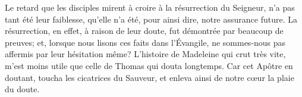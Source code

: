 Le retard que les disciples mirent à croire à la résurrection du Seigneur,
	n’a pas tant été leur faiblesse,
	qu’elle n’a été, pour ainsi dire, notre assurance future.
La résurrection, en effet, à raison de leur doute,
	fut démontrée par beaucoup de preuves;
	et, lorsque nous lisons ces faits dans l’Évangile,
	ne sommes-nous pas affermis par leur hésitation même?
L’histoire de Madeleine qui crut très vite,
	m’est moins utile que celle de Thomas qui douta longtemps.
Car cet Apôtre en doutant, toucha les cicatrices du Sauveur,
	et enleva ainsi de notre cœur la plaie du doute.
